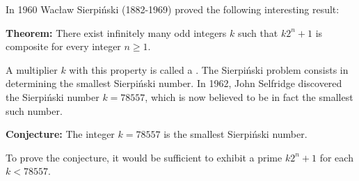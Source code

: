\documentclass[12pt]{article}
\begin{document}

In 1960 Wac{\l}aw Sierpi\'nski (1882-1969) proved the following interesting result:

\textbf{Theorem:}
There exist infinitely many odd integers $k$ such that 
$k2^n + 1$ is composite for every integer $n \geq 1$. 

A multiplier $k$ with this property
is called a .
The Sierpi\'nski problem consists in
determining the smallest Sierpi\'nski number.
In 1962, John Selfridge discovered the Sierpi\'nski number $k = 78557$,
which is now believed to be in fact the smallest such number. 

\textbf{Conjecture:}
The integer $k = 78557$ is the smallest Sierpi\'nski number.

To prove the conjecture, it would be sufficient to exhibit
a prime $k2^n+1$ for each $k < 78557$.
\end{document}
